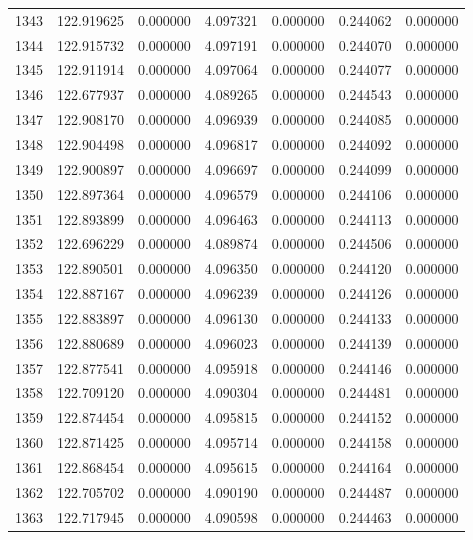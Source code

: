 \begin{tabular}{rrrrrrr}
1343 & 122.919625 &    0.000000 &  4.097321 &    0.000000 &    0.244062 &  0.000000 \\
1344 & 122.915732 &    0.000000 &  4.097191 &    0.000000 &    0.244070 &  0.000000 \\
1345 & 122.911914 &    0.000000 &  4.097064 &    0.000000 &    0.244077 &  0.000000 \\
1346 & 122.677937 &    0.000000 &  4.089265 &    0.000000 &    0.244543 &  0.000000 \\
1347 & 122.908170 &    0.000000 &  4.096939 &    0.000000 &    0.244085 &  0.000000 \\
1348 & 122.904498 &    0.000000 &  4.096817 &    0.000000 &    0.244092 &  0.000000 \\
1349 & 122.900897 &    0.000000 &  4.096697 &    0.000000 &    0.244099 &  0.000000 \\
1350 & 122.897364 &    0.000000 &  4.096579 &    0.000000 &    0.244106 &  0.000000 \\
1351 & 122.893899 &    0.000000 &  4.096463 &    0.000000 &    0.244113 &  0.000000 \\
1352 & 122.696229 &    0.000000 &  4.089874 &    0.000000 &    0.244506 &  0.000000 \\
1353 & 122.890501 &    0.000000 &  4.096350 &    0.000000 &    0.244120 &  0.000000 \\
1354 & 122.887167 &    0.000000 &  4.096239 &    0.000000 &    0.244126 &  0.000000 \\
1355 & 122.883897 &    0.000000 &  4.096130 &    0.000000 &    0.244133 &  0.000000 \\
1356 & 122.880689 &    0.000000 &  4.096023 &    0.000000 &    0.244139 &  0.000000 \\
1357 & 122.877541 &    0.000000 &  4.095918 &    0.000000 &    0.244146 &  0.000000 \\
1358 & 122.709120 &    0.000000 &  4.090304 &    0.000000 &    0.244481 &  0.000000 \\
1359 & 122.874454 &    0.000000 &  4.095815 &    0.000000 &    0.244152 &  0.000000 \\
1360 & 122.871425 &    0.000000 &  4.095714 &    0.000000 &    0.244158 &  0.000000 \\
1361 & 122.868454 &    0.000000 &  4.095615 &    0.000000 &    0.244164 &  0.000000 \\
1362 & 122.705702 &    0.000000 &  4.090190 &    0.000000 &    0.244487 &  0.000000 \\
1363 & 122.717945 &    0.000000 &  4.090598 &    0.000000 &    0.244463 &  0.000000 \\

\end{tabular}
